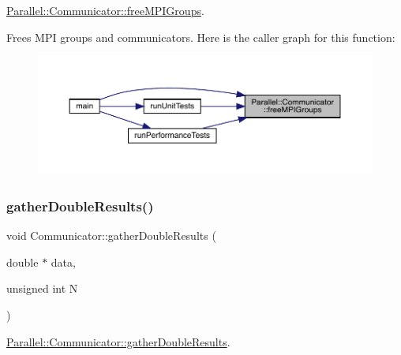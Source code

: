 \mbox{\hyperlink{class_parallel_1_1_communicator_aca0ac979aee1a649dbe5d4582b06a707}{Parallel\+::\+Communicator\+::free\+M\+P\+I\+Groups}}. 

Frees M\+PI groups and communicators. Here is the caller graph for this function\+:\nopagebreak
\begin{figure}[H]
\begin{center}
\leavevmode
\includegraphics[width=350pt]{class_parallel_1_1_communicator_aca0ac979aee1a649dbe5d4582b06a707_icgraph}
\end{center}
\end{figure}
\mbox{\label{class_parallel_1_1_communicator_ae5739683ff54a7c39af6e37920e70ea5}} 
\subsubsection{\texorpdfstring{gatherDoubleResults()}{gatherDoubleResults()}}
{\footnotesize\ttfamily void Communicator\+::gather\+Double\+Results (\begin{DoxyParamCaption}\item[{double $\ast$}]{data,  }\item[{unsigned int}]{N }\end{DoxyParamCaption})\hspace{0.3cm}{\ttfamily [static]}}



\mbox{\hyperlink{class_parallel_1_1_communicator_ae5739683ff54a7c39af6e37920e70ea5}{Parallel\+::\+Communicator\+::gather\+Double\+Results}}. 


